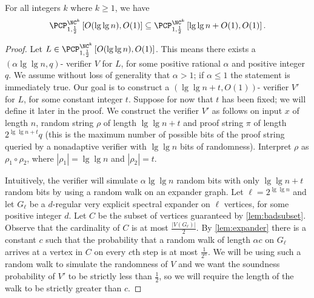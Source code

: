 \documentclass[]{article}
\newcommand{\PCPcs}[5]{\PCP^{#1}_{#2, #3}\left[#4, #5\right]}
\begin{document}
\begin{lemma}[{\cite[Lemma~4]{fs96}}]\label{lem:derandomize}
  For all integers $k$ where $k \geq 1$, we have
  \begin{equation*}
    \PCPcs{\NC^k}{1}{\frac{1}{2}}{O(\lg \lg n)}{O(1)}
    \subseteq
    \PCPcs{\NC^k}{1}{\frac{1}{2}}{\lg \lg n + O(1)}{O(1)}.
  \end{equation*}
\end{lemma}
\begin{proof}
  Let $L \in \PCPcs{\NC^k}{1}{\frac{1}{2}}{O(\lg \lg n)}{O(1)}$.
  This means there exists a $(\alpha \lg \lg n, q)$-\PCP{} verifier $V$ for $L$, for some positive rational $\alpha$ and positive integer $q$.
  We assume without loss of generality that $\alpha > 1$; if $\alpha \leq 1$ the statement is immediately true.
  Our goal is to construct a $(\lg \lg n + t, O(1))$-\PCP{} verifier $V'$ for $L$, for some constant integer $t$.
  Suppose for now that $t$ has been fixed; we will define it later in the proof.
  We construct the verifier $V'$ as follows on input $x$ of length $n$, random string $\rho$ of length $\lg \lg n + t$ and proof string $\pi$ of length $2^{\lg \lg n + t} q$ (this is the maximum number of possible bits of the proof string queried by a nonadaptive verifier with $\lg \lg n$ bits of randomness).
  Interpret $\rho$ as $\rho_1 \circ \rho_2$, where $|\rho_1| = \lg \lg n$ and $|\rho_2| = t$.

  Intuitively, the verifier will simulate $\alpha \lg \lg n$ random bits with only $\lg \lg n + t$ random bits by using a random walk on an expander graph.
  Let $\ell = 2^{\lg \lg n}$ and let $G_\ell$ be a $d$-regular very explicit spectral expander on $\ell$ vertices, for some positive integer $d$.
  Let $C$ be the subset of vertices guaranteed by \autoref{lem:badsubset}.
  Observe that the cardinality of $C$ is at most $\frac{|V(G_\ell)|}{2}$.
  By \autoref{lem:expander} there is a constant $c$ such that the probability that a random walk of length $\alpha c$ on $G_\ell$ arrives at a vertex in $C$ on every $c$th step is at most $\frac{1}{2^\alpha}$.
  We will be using such a random walk to simulate the randomness of $V$ and we want the soundness probability of $V'$ to be strictly less than $\frac{1}{2}$, so we will require the length of the walk to be strictly greater than $c$.


\end{proof}
\end{document}
